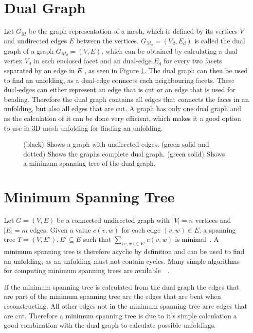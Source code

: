 \documentclass[draft,final]{vutinfth} %
\begin{document}
\section{Dual Graph}

Let $G_M$ be the graph representation of a mesh, which is defined by its vertices $V$ and undirected edges $E$ between the vertices. $G_{M_d} = (V_d, E_d)$ is called the dual graph of a graph $G_{M_d} = (V,E)$, which can be obtained by calculating a dual vertex $V_d$ in each enclosed facet and an dual-edge $E_d$ for every two facets separated by an edge in $E$ \cite{gross2004handbook}, as seen in Figure \ref{fig:dualgraph}. The dual graph can then be used to find an unfolding, as a dual-edge connects each neighbouring facets. These dual-edges can either represent an edge that is cut or an edge that is used for bending. Therefore the dual graph contains all edges that connects the faces in an unfolding, but also all edges that are cut. A graph has only one dual graph and as the calculation of it can be done very efficient, which makes it a good option to use in 3D mesh unfolding for finding an unfolding.

\begin{figure}

\caption{(black) Shows a graph with undirected edges. (green solid and dotted) Shows the graphs complete dual graph. (green solid) Shows a minimum spanning tree of the dual graph.}
\label{fig:dualgraph}
\end{figure}

\section{Minimum Spanning Tree}

Let $G = (V,E)$ be a connected undirected graph with $|V| = n$ vertices and $|E| = m$ edges. Given a value $c(v,w)$ for each edge $(v,w) \in E$, a spanning tree $T = (V,E'), E' \subseteq E$ such that $\sum_{\{v,w\}\in E'} c(v,w)$ is minimal~\cite{cheriton1976finding}. A minimum spanning tree is therefore acyclic by definition and can be used to find an unfolding, as an unfolding must not contain cycles. Many simple algorithms for computing minimum spanning trees are available~\cite{kruskal1956shortest}~\cite{ahuja1990faster}. 

If the minimum spanning tree is calculated from the dual graph the edges that are part of the minimum spanning tree are the edges that are bent when reconstructing. All other edges not in the minimum spanning tree arre edges that are cut. Therefore a minimum spanning tree is due to it's simple calculation a good combination with the dual graph to calculate possible unfoldings. 
\end{document}
